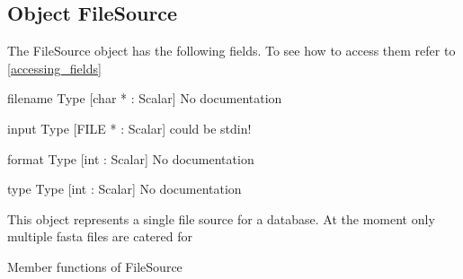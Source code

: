 \subsection{Object FileSource}

\label{object_FileSource}

The FileSource object has the following fields. To see how to access them refer to \ref{accessing_fields}
\begin{description}
\item{filename} Type [char * : Scalar] No documentation

\item{input} Type [FILE * : Scalar]  could be stdin! 

\item{format} Type [int : Scalar] No documentation

\item{type} Type [int : Scalar] No documentation

\end{description}
This object represents a single
file source for a database. At
the moment only multiple fasta
files are catered for




Member functions of FileSource

